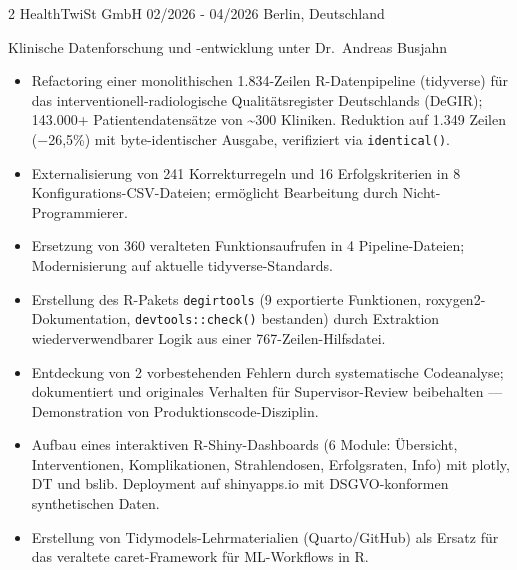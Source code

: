 \documentclass{thejus_cv}
\begin{document}
\begin{paracol}{2}
             {HealthTwiSt GmbH}
             {02/2026 - 04/2026}
             {Berlin, Deutschland}
             {Klinische Datenforschung und -entwicklung unter Dr.~Andreas Busjahn
             \begin{itemize}\setlength{\itemsep}{0pt}\setlength{\parskip}{0pt}
                   \item Refactoring einer monolithischen 1.834-Zeilen R-Datenpipeline (tidyverse) f\"ur das interventionell-radiologische Qualit\"atsregister Deutschlands (DeGIR); 143.000+ Patientendatens\"atze von \textasciitilde300 Kliniken. Reduktion auf 1.349 Zeilen ($-$26,5\%) mit byte-identischer Ausgabe, verifiziert via \texttt{identical()}.
                   \item Externalisierung von 241 Korrekturregeln und 16 Erfolgskriterien in 8 Konfigurations-CSV-Dateien; erm\"oglicht Bearbeitung durch Nicht-Programmierer.
                   \item Ersetzung von 360 veralteten Funktionsaufrufen in 4 Pipeline-Dateien; Modernisierung auf aktuelle tidyverse-Standards.
                   \item Erstellung des R-Pakets \texttt{degirtools} (9 exportierte Funktionen, roxygen2-Dokumentation, \texttt{devtools::check()} bestanden) durch Extraktion wiederverwendbarer Logik aus einer 767-Zeilen-Hilfsdatei.
                   \item Entdeckung von 2 vorbestehenden Fehlern durch systematische Codeanalyse; dokumentiert und originales Verhalten f\"ur Supervisor-Review beibehalten --- Demonstration von Produktionscode-Disziplin.
                   \item Aufbau eines interaktiven R-Shiny-Dashboards (6 Module: \"Ubersicht, Interventionen, Komplikationen, Strahlendosen, Erfolgsraten, Info) mit plotly, DT und bslib. Deployment auf shinyapps.io mit DSGVO-konformen synthetischen Daten.
                   \item Erstellung von Tidymodels-Lehrmaterialien (Quarto/GitHub) als Ersatz f\"ur das veraltete caret-Framework f\"ur ML-Workflows in R.
               \end{itemize}\vspace{-0.3em}}


\end{paracol}
\end{document}
